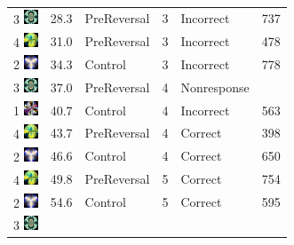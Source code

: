 \documentclass[]{article}
\begin{document}
\begin{longtable}[]{@{}lrlrll@{}}
3
\includegraphics[width=0.16670in,height=0.16670in]{../ReversalLearning_20130621/images/abs3.jpg}
& 28.3 & PreReversal & 3 & Incorrect & 737\tabularnewline
4
\includegraphics[width=0.16670in,height=0.16670in]{../ReversalLearning_20130621/images/abs4.jpg}
& 31.0 & PreReversal & 3 & Incorrect & 478\tabularnewline
2
\includegraphics[width=0.16670in,height=0.16670in]{../ReversalLearning_20130621/images/abs2.jpg}
& 34.3 & Control & 3 & Incorrect & 778\tabularnewline
3
\includegraphics[width=0.16670in,height=0.16670in]{../ReversalLearning_20130621/images/abs3.jpg}
& 37.0 & PreReversal & 4 & Nonresponse &\tabularnewline
1
\includegraphics[width=0.16670in,height=0.16670in]{../ReversalLearning_20130621/images/abs1.jpg}
& 40.7 & Control & 4 & Incorrect & 563\tabularnewline
4
\includegraphics[width=0.16670in,height=0.16670in]{../ReversalLearning_20130621/images/abs4.jpg}
& 43.7 & PreReversal & 4 & Correct & 398\tabularnewline
2
\includegraphics[width=0.16670in,height=0.16670in]{../ReversalLearning_20130621/images/abs2.jpg}
& 46.6 & Control & 4 & Correct & 650\tabularnewline
4
\includegraphics[width=0.16670in,height=0.16670in]{../ReversalLearning_20130621/images/abs4.jpg}
& 49.8 & PreReversal & 5 & Correct & 754\tabularnewline
2
\includegraphics[width=0.16670in,height=0.16670in]{../ReversalLearning_20130621/images/abs2.jpg}
& 54.6 & Control & 5 & Correct & 595\tabularnewline
3
\includegraphics[width=0.16670in,height=0.16670in]{../ReversalLearning_20130621/images/abs3.jpg}

\end{longtable}
\end{document}
